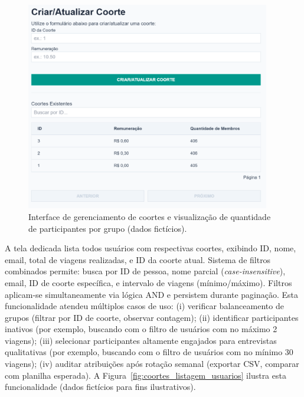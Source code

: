  \begin{figure}[H]
   \centering
   \includegraphics[width=0.95\textwidth]{figuras/coortes.PNG}
   \caption{Interface de gerenciamento de coortes e visualização de quantidade de participantes por grupo (dados fictícios).}
   \label{fig:coortes_listagem}
 \end{figure}

 A tela dedicada lista todos usuários com respectivas coortes, exibindo ID, nome, email, total de viagens realizadas, e ID da coorte atual. Sistema de filtros combinados permite: busca por ID de pessoa, nome parcial (\textit{case-insensitive}), email, ID de coorte específica, e intervalo de viagens (mínimo/máximo). Filtros aplicam-se simultaneamente via lógica AND e persistem durante paginação. Esta funcionalidade atendeu múltiplos casos de uso: (i) verificar balanceamento de grupos (filtrar por ID de coorte, observar contagem); (ii) identificar participantes inativos (por exemplo, buscando com o filtro de usuários com no máximo 2 viagens); (iii) selecionar participantes altamente engajados para entrevistas qualitativas (por exemplo, buscando com o filtro de usuários com no mínimo 30 viagens); (iv) auditar atribuições após rotação semanal (exportar CSV, comparar com planilha esperada). A Figura~\ref{fig:coortes_listagem_usuarios} ilustra esta funcionalidade (dados fictícios para fins ilustrativos).

